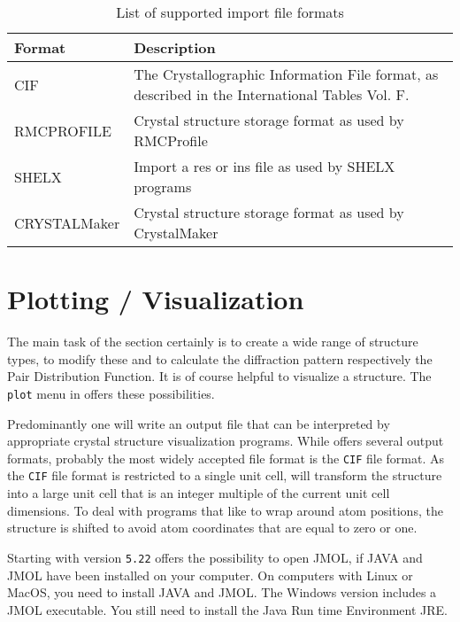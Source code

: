 \begin{table}[!tbh]
\centering
\begin{tabularx}{\textwidth}{|p{30mm}|X|}
  \hline
  {\bf Format } & {\bf Description} \\
  \hline\hline
  CIF         & The Crystallographic Information File format, as    
                described in the International Tables 
                \cite{tables} Vol. F.\\
  \hline
  RMCPROFILE  & Crystal structure storage format as used by RMCProfile\\
  \hline
  SHELX & Import a res or ins file as used by SHELX programs \\
  \hline
  CRYSTALMaker & Crystal structure storage format as used by CrystalMaker \\
  \hline
\end{tabularx}
\caption{\label{struc-imp-tab1} List of supported import file formats}
\end{table}


\section{Plotting / Visualization \label{struc-plot}}

The main task of the \Discus section certainly is to create a wide 
range of structure types, to modify these and to calculate the diffraction
pattern respectively the Pair Distribution Function. It is of course 
helpful to visualize a structure. The {\tt plot} menu in \Discus offers
these possibilities. 

Predominantly one will write an output file that can be interpreted 
by appropriate crystal structure visualization programs. While 
\Discus offers several output formats, probably the most widely accepted
file format is the {\tt CIF} file format. As the {\tt CIF} file 
format is restricted to a single unit cell, \Discus will transform the
structure into a large unit cell that is an integer multiple of the current  
unit cell dimensions. To deal with programs that like to wrap around
atom positions, the structure is shifted to avoid atom coordinates that
are equal to zero or one.

Starting with version {\tt 5.22} \Discus offers the possibility to
open JMOL, if JAVA and JMOL have been installed on your computer. 
On computers with Linux or MacOS, you need to install JAVA and JMOL. 
The Windows version includes a JMOL executable. You still need to 
install the Java Run time Environment JRE. 

